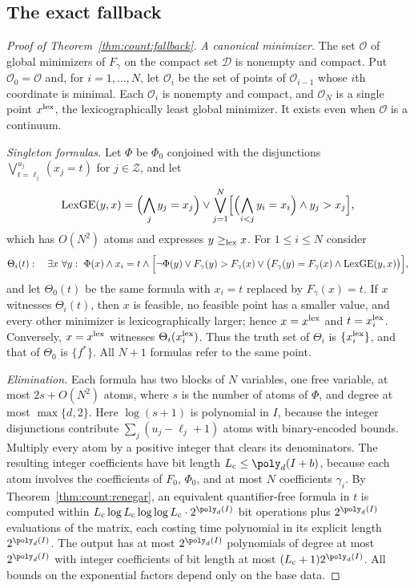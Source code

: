 \subsection{The exact fallback}

\begin{proof}[Proof of Theorem~\ref{thm:count:fallback}]
\emph{A canonical minimizer.} The set $\mathcal O$ of global minimizers of
$F_\gamma$ on the compact set $\mathcal D$ is nonempty and compact. Put
$\mathcal O_0=\mathcal O$ and, for $i=1,\dots,N$, let $\mathcal O_i$ be the set
of points of $\mathcal O_{i-1}$ whose $i$th coordinate is minimal. Each
$\mathcal O_i$ is nonempty and compact, and $\mathcal O_N$ is a single point
$x^{\rm lex}$, the lexicographically least global minimizer. It exists even
when $\mathcal O$ is a continuum.

\emph{Singleton formulas.} Let $\Phi$ be $\Phi_0$ conjoined with the
disjunctions $\bigvee_{t=\ell_j}^{u_j}(x_j=t)$ for $j\in\mathcal Z$, and let
\[
 \operatorname{LexGE}(y,x)=\Bigl(\bigwedge_{j}y_j=x_j\Bigr)\vee
 \bigvee_{j=1}^N\Bigl[\Bigl(\bigwedge_{i<j}y_i=x_i\Bigr)\wedge y_j>x_j\Bigr],
\]
which has $O(N^2)$ atoms and expresses $y\ge_{\rm lex}x$. For $1\le i\le N$
consider
\[
 \Theta_i(t):\quad
 \exists x\ \forall y:\ \Phi(x)\wedge x_i=t\wedge
 \Bigl[\neg\Phi(y)\vee F_\gamma(y)>F_\gamma(x)\vee
 \bigl(F_\gamma(y)=F_\gamma(x)\wedge\operatorname{LexGE}(y,x)\bigr)\Bigr],
\]
and let $\Theta_0(t)$ be the same formula with $x_i=t$ replaced by
$F_\gamma(x)=t$. If $x$ witnesses $\Theta_i(t)$, then $x$ is feasible, no
feasible point has a smaller value, and every other minimizer is
lexicographically larger; hence $x=x^{\rm lex}$ and $t=x^{\rm lex}_i$.
Conversely, $x=x^{\rm lex}$ witnesses $\Theta_i(x_i^{\rm lex})$. Thus the truth
set of $\Theta_i$ is $\{x_i^{\rm lex}\}$, and that of $\Theta_0$ is $\{f^*\}$.
All $N+1$ formulas refer to the same point.

\emph{Elimination.} Each formula has two blocks of $N$ variables, one free
variable, at most $2s+O(N^2)$ atoms, where $s$ is the number of atoms of
$\Phi$, and degree at most $\max\{d,2\}$. Here $\log(s+1)$ is polynomial in
$I$, because the integer disjunctions contribute $\sum_j(u_j-\ell_j+1)$ atoms
with binary-encoded bounds. Multiply every atom by a positive integer that
clears its denominators. The resulting integer coefficients have bit length
$L_{\rm c}\le\poly_d(I+b)$, because each atom involves the coefficients of
$F_0$, $\Phi_0$, and at most $N$ coefficients $\gamma_i$. By
Theorem~\ref{thm:count:renegar}, an equivalent quantifier-free formula in $t$
is computed within $L_{\rm c}\log L_{\rm c}\log\log L_{\rm c}\cdot2^{\poly_d(I)}$
bit operations plus $2^{\poly_d(I)}$ evaluations of the matrix, each costing
time polynomial in its explicit length $2^{\poly_d(I)}$. The output has at most
$2^{\poly_d(I)}$ polynomials of degree at most $2^{\poly_d(I)}$ with integer
coefficients of bit length at most $(L_{\rm c}+1)2^{\poly_d(I)}$. All bounds
on the exponential factors depend only on the base data.


\end{proof}
